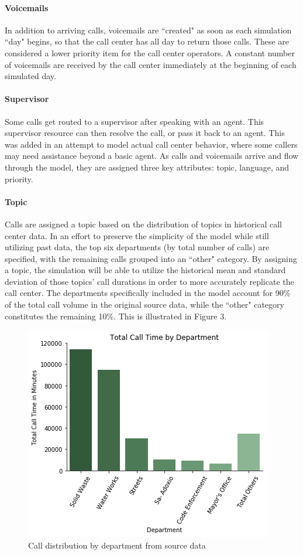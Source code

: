 \documentclass[12pt,twocolumn]{article}
\begin{document}
	\paragraph{Voicemails}
In addition to arriving calls, voicemails are ``created" as soon as each simulation ``day" begins, so that the call center has all day to return those calls.  These are considered a lower priority item for the call center operators.  A constant number of voicemails are received by the call center immediately at the beginning of each simulated day.

	\paragraph{Supervisor}
Some calls get routed to a supervisor after speaking with an agent.  This supervisor resource can then resolve the call, or pass it back to an agent.  This was added in an attempt to model actual call center behavior, where some callers may need assistance beyond a basic agent.  As calls and voicemails arrive and flow through the model, they are assigned three key attributes: topic, language, and priority.

	\paragraph{Topic}

Calls are assigned a topic based on the distribution of topics in historical call center data.  In an effort to preserve the simplicity of the model while still utilizing past data, the top six departments (by total number of calls) are specified, with the remaining calls grouped into an ``other" category.  By assigning a topic, the simulation will be able to utilize the historical mean and standard deviation of those topics' call durations in order to more accurately replicate the call center.  The departments specifically included in the model account for 90\% of the total call volume in the original source data, while the ``other" category constitutes the remaining 10\%.  This is illustrated in Figure 3.


\begin{figure}[h]
	\includegraphics[scale=.53]{Calls_Department_sim.png}
	\caption{Call distribution by department from source data}
\end{figure}
\end{document}
